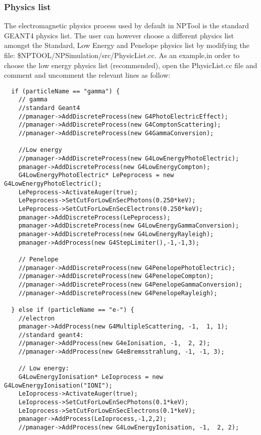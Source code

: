 \documentclass[a4paper,12pt]{article}
\begin{document}
\subsubsection{Physics list}

The electromagnetic physics process used by default in NPTool is the standard GEANT4 physics 
list. The user can  however choose a different physics list amongst the Standard, Low Energy 
and Penelope physics list by modifying the file: \$NPTOOL/NPSimulation/src/PhysicList.cc.
As an example,in order to choose the low energy physics list (recommended), open the 
PhysicList.cc file and comment and uncomment the relevant lines as follow:

\scriptsize
\begin{verbatim}
  if (particleName == "gamma") {
    // gamma
    //standard Geant4
    //pmanager->AddDiscreteProcess(new G4PhotoElectricEffect);
    //pmanager->AddDiscreteProcess(new G4ComptonScattering);
    //pmanager->AddDiscreteProcess(new G4GammaConversion);

    //Low energy
    //pmanager->AddDiscreteProcess(new G4LowEnergyPhotoElectric);
    pmanager->AddDiscreteProcess(new G4LowEnergyCompton);
    G4LowEnergyPhotoElectric* LePeprocess = new G4LowEnergyPhotoElectric();
    LePeprocess->ActivateAuger(true);
    LePeprocess->SetCutForLowEnSecPhotons(0.250*keV);
    LePeprocess->SetCutForLowEnSecElectrons(0.250*keV);
    pmanager->AddDiscreteProcess(LePeprocess);
    pmanager->AddDiscreteProcess(new G4LowEnergyGammaConversion);
    pmanager->AddDiscreteProcess(new G4LowEnergyRayleigh);
    pmanager->AddProcess(new G4StepLimiter(),-1,-1,3);

    // Penelope
    //pmanager->AddDiscreteProcess(new G4PenelopePhotoElectric);
    //pmanager->AddDiscreteProcess(new G4PenelopeCompton);
    //pmanager->AddDiscreteProcess(new G4PenelopeGammaConversion);
    //pmanager->AddDiscreteProcess(new G4PenelopeRayleigh);

  } else if (particleName == "e-") {
    //electron
    pmanager->AddProcess(new G4MultipleScattering, -1,  1, 1);
    //standard geant4:
    //pmanager->AddProcess(new G4eIonisation, -1,  2, 2);
    //pmanager->AddProcess(new G4eBremsstrahlung, -1, -1, 3);
    
    // Low energy:
    G4LowEnergyIonisation* LeIoprocess = new G4LowEnergyIonisation("IONI");
    LeIoprocess->ActivateAuger(true);
    LeIoprocess->SetCutForLowEnSecPhotons(0.1*keV);
    LeIoprocess->SetCutForLowEnSecElectrons(0.1*keV);
    pmanager->AddProcess(LeIoprocess,-1,2,2);
    //pmanager->AddProcess(new G4LowEnergyIonisation, -1,  2, 2);
    

\end{verbatim}
\end{document}
